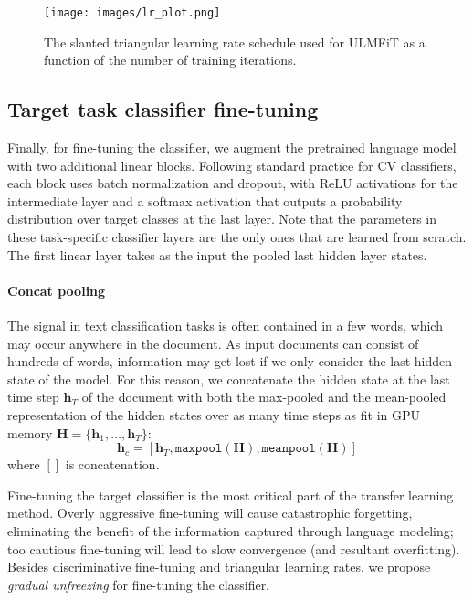 \documentclass[11pt,a4paper]{article}
\begin{document}
\begin{figure}[h]
\centering
\texttt{[image: images/lr\_plot.png]}
\caption{The slanted triangular learning rate schedule used for ULMFiT as a function of the number of training iterations.}
\label{fig:triangular_lr}
\end{figure}

\subsection{Target task classifier fine-tuning} \label{sec:clas-fine-tuning}

Finally, for fine-tuning the classifier, we augment the pretrained language model with two additional linear blocks. 
Following standard practice for CV classifiers, each block uses batch normalization \cite{ioffe2015batch} and dropout, with ReLU activations for the intermediate layer and a softmax activation that outputs a probability distribution over target classes at the last layer. Note that the parameters in these task-specific classifier layers are the only ones that are learned from scratch. The first linear layer takes as the input the pooled last hidden layer states.

\paragraph{Concat pooling} The signal in text classification tasks is often contained in a few words, which may occur anywhere in the document. As input documents can consist of hundreds of words, information may get lost if we only consider the last hidden state of the model. For this reason, we concatenate the hidden state at the last time step $\mathbf{h}_T$ of the document with both the max-pooled and the mean-pooled representation of the hidden states over as many time steps as fit in GPU memory $\mathbf{H} = \{\mathbf{h}_1, \ldots, \mathbf{h}_T\}$:
\begin{equation}
\mathbf{h}_c = [\mathbf{h}_T, \mathtt{maxpool}(\mathbf{H}), \mathtt{meanpool}(\mathbf{H})]
\end{equation}
where $[]$ is concatenation.

Fine-tuning the target classifier is the most critical part of the transfer learning method. Overly aggressive fine-tuning will cause catastrophic forgetting, eliminating the benefit of the information captured through language modeling; too cautious fine-tuning will lead to slow convergence (and resultant overfitting). Besides discriminative fine-tuning and triangular learning rates, we propose \emph{gradual unfreezing} for fine-tuning the classifier.
\end{document}
